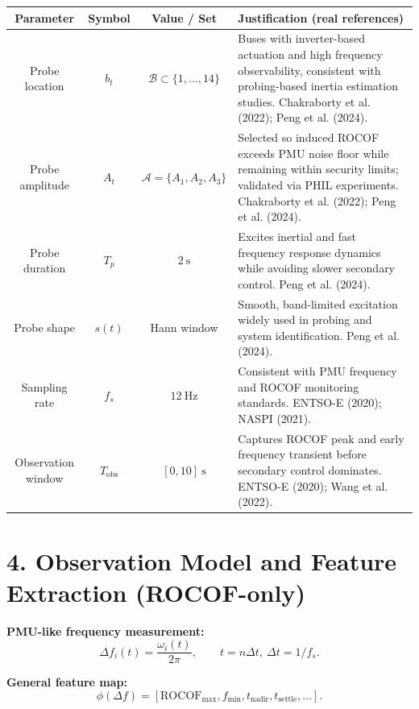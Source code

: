 \documentclass[12pt]{article}
\begin{document}
\begin{center}
\renewcommand{\arraystretch}{1.35}
\begin{tabular}{|c|c|c|p{4.6in}|}
\hline
\textbf{Parameter} & \textbf{Symbol} & \textbf{Value / Set} & \textbf{Justification (real references)} \\
\hline
Probe location &
$b_t$ &
$\mathcal{B}\subset\{1,\dots,14\}$ &
Buses with inverter-based actuation and high frequency observability, consistent with probing-based inertia estimation studies.
\newline
Chakraborty et al. (2022); Peng et al. (2024). \\
\hline
Probe amplitude &
$A_t$ &
$\mathcal{A}=\{A_1,A_2,A_3\}$ &
Selected so induced ROCOF exceeds PMU noise floor while remaining within security limits; validated via PHIL experiments.
\newline
Chakraborty et al. (2022); Peng et al. (2024). \\
\hline
Probe duration &
$T_p$ &
$2~\mathrm{s}$ &
Excites inertial and fast frequency response dynamics while avoiding slower secondary control. Peng et al. (2024). \\
\hline
Probe shape &
$s(t)$ &
Hann window &
Smooth, band-limited excitation widely used in probing and system identification.
\newline
Peng et al. (2024). \\
\hline
Sampling rate &
$f_s$ &
$12~\mathrm{Hz}$ &
Consistent with PMU frequency and ROCOF monitoring standards.
\newline
ENTSO-E (2020); NASPI (2021). \\
\hline
Observation window &
$T_{\text{obs}}$ &
$[0,10]~\mathrm{s}$ &
Captures ROCOF peak and early frequency transient before secondary control dominates.
\newline
ENTSO-E (2020); Wang et al. (2022). \\
\hline
\end{tabular}
\end{center}

\newpage
\section*{4. Observation Model and Feature Extraction (ROCOF-only)}

\textbf{PMU-like frequency measurement:}
\[
\Delta f_i(t)=\frac{\omega_i(t)}{2\pi}, \qquad t=n\Delta t,\ \Delta t=1/f_s.
\]

\textbf{General feature map:}
\[
\phi(\Delta f)=
[\mathrm{ROCOF}_{\max}, f_{\min}, t_{\text{nadir}}, t_{\text{settle}}, \dots].
\]
\end{document}
